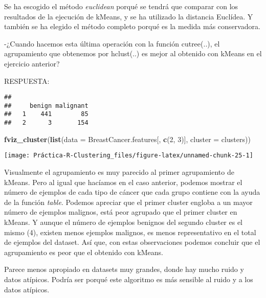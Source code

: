 \documentclass[
]{article}
\newenvironment{Shaded}{\begin{snugshade}}{\end{snugshade}}
\newcommand{\CommentTok}[1]{\textcolor[rgb]{0.56,0.35,0.01}{\textit{#1}}}
\newcommand{\DataTypeTok}[1]{\textcolor[rgb]{0.13,0.29,0.53}{#1}}
\newcommand{\DecValTok}[1]{\textcolor[rgb]{0.00,0.00,0.81}{#1}}
\newcommand{\KeywordTok}[1]{\textcolor[rgb]{0.13,0.29,0.53}{\textbf{#1}}}
\newcommand{\NormalTok}[1]{#1}
\newcommand{\OperatorTok}[1]{\textcolor[rgb]{0.81,0.36,0.00}{\textbf{#1}}}
\begin{document}
Se ha escogido el método \emph{euclidean} porqué se tendrá que comparar
con los resultados de la ejecución de kMeans, y se ha utilizado la
distancia Euclídea. Y también se ha elegido el método completo porqué es
la medida más conservadora.

-¿Cuando hacemos esta última operación con la función cutree(..), el
agrupamiento que obtenemos por hclust(..) es mejor al obtenido con
kMeans en el ejercicio anterior?

RESPUESTA:

\begin{Shaded}
\end{Shaded}

\begin{verbatim}
##    
##     benign malignant
##   1    441        85
##   2      3       154
\end{verbatim}

\begin{Shaded}
\begin{Highlighting}[]
\KeywordTok{fviz_cluster}\NormalTok{(}\KeywordTok{list}\NormalTok{(}\DataTypeTok{data =}\NormalTok{ BreastCancer.features[, }\KeywordTok{c}\NormalTok{(}\DecValTok{2}\NormalTok{, }\DecValTok{3}\NormalTok{)], }\DataTypeTok{cluster =}\NormalTok{ clusters))}
\end{Highlighting}
\end{Shaded}

\begin{center}\texttt{[image: Práctica-R-Clustering\_files/figure-latex/unnamed-chunk-25-1]} \end{center}

Visualmente el agrupamiento es muy parecido al primer agrupamiento de
kMeans. Pero al igual que hacíamos en el caso anterior, podemos mostrar
el número de ejemplos de cada tipo de cáncer que cada grupo contiene con
la ayuda de la función \emph{table}. Podemos apreciar que el primer
cluster engloba a un mayor número de ejemplos malignos, está peor
agrupado que el primer cluster en kMeans. Y aunque el número de ejemplos
benignos del segundo cluster es el mismo (4), existen menos ejemplos
malignos, es menos representativo en el total de ejemplos del dataset.
Así que, con estas observaciones podemos concluir que el agrupamiento es
peor que el obtenido con kMeans.

Parece menos apropiado en datasets muy grandes, donde hay mucho ruido y
datos atípicos. Podría ser porqué este algoritmo es más sensible al
ruido y a los datos atípicos.
\end{document}
